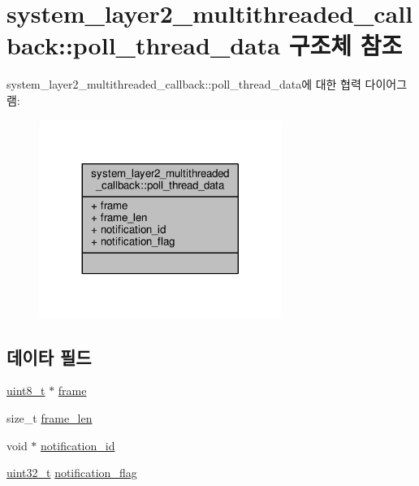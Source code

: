 \hypertarget{structavdecc__lib_1_1system__layer2__multithreaded__callback_1_1poll__thread__data}{}\section{system\+\_\+layer2\+\_\+multithreaded\+\_\+callback\+:\+:poll\+\_\+thread\+\_\+data 구조체 참조}
\label{structavdecc__lib_1_1system__layer2__multithreaded__callback_1_1poll__thread__data}


system\+\_\+layer2\+\_\+multithreaded\+\_\+callback\+:\+:poll\+\_\+thread\+\_\+data에 대한 협력 다이어그램\+:
\nopagebreak
\begin{figure}[H]
\begin{center}
\leavevmode
\includegraphics[width=224pt]{structavdecc__lib_1_1system__layer2__multithreaded__callback_1_1poll__thread__data__coll__graph}
\end{center}
\end{figure}
\subsection*{데이타 필드}
\begin{DoxyCompactItemize}
\item 
\hyperlink{stdint_8h_aba7bc1797add20fe3efdf37ced1182c5}{uint8\+\_\+t} $\ast$ \hyperlink{structavdecc__lib_1_1system__layer2__multithreaded__callback_1_1poll__thread__data_af2e8f7e8583d0d7c40fe4ea5620f857e}{frame}
\item 
size\+\_\+t \hyperlink{structavdecc__lib_1_1system__layer2__multithreaded__callback_1_1poll__thread__data_ad0840731d95fd5f25b0e73f8338718b6}{frame\+\_\+len}
\item 
void $\ast$ \hyperlink{structavdecc__lib_1_1system__layer2__multithreaded__callback_1_1poll__thread__data_a1efd7ce38af0ff90ffefd52133214023}{notification\+\_\+id}
\item 
\hyperlink{parse_8c_a6eb1e68cc391dd753bc8ce896dbb8315}{uint32\+\_\+t} \hyperlink{structavdecc__lib_1_1system__layer2__multithreaded__callback_1_1poll__thread__data_a01e6e66d891af833ee1998e9309623cd}{notification\+\_\+flag}
\end{DoxyCompactItemize}


